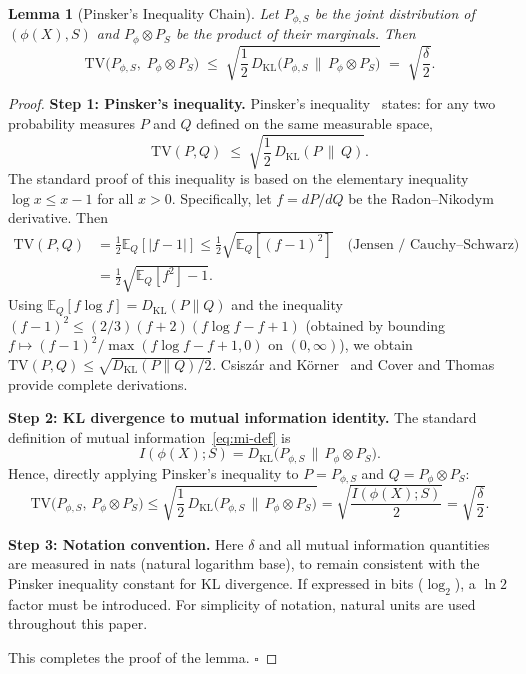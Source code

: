 \documentclass[12pt,a4paper]{article}
\newtheorem{lemma}[theorem]{Lemma}
\newcommand{\E}{\mathbb{E}}
\newcommand{\KL}{D_{\mathrm{KL}}}
\newcommand{\TV}{\mathrm{TV}}
\begin{document}
\begin{lemma}[Pinsker's Inequality Chain]
\label{lem:pinsker}
Let $P_{\phi,S}$ be the joint distribution of $(\phi(X), S)$ and
$P_\phi \otimes P_S$ be the product of their marginals.
Then
\begin{equation}\label{eq:pinsker-chain}
    \TV\bigl(P_{\phi,S},\; P_\phi \otimes P_S\bigr)
    \;\leq\; \sqrt{\frac{1}{2}\,\KL\bigl(P_{\phi,S} \,\big\|\,
                        P_\phi \otimes P_S\bigr)}
    \;=\; \sqrt{\frac{\delta}{2}}.
\end{equation}
\end{lemma}

\begin{proof}
\textbf{Step 1: Pinsker's inequality.}
Pinsker's inequality~\citep{pinsker1964information,cover1999elements} states:
for any two probability measures $P$ and $Q$ defined on the same measurable space,
\begin{equation}\label{eq:pinsker-raw}
    \TV(P, Q) \;\leq\; \sqrt{\frac{1}{2}\,\KL(P \,\|\, Q)}.
\end{equation}
The standard proof of this inequality is based on the elementary inequality $\log x \leq x-1$ for all $x>0$.
Specifically, let $f = dP/dQ$ be the Radon--Nikodym derivative. Then
\begin{align*}
    \TV(P,Q) &= \frac12 \E_Q[|f-1|]
             \leq \frac12 \sqrt{\E_Q[(f-1)^2]} \quad\text{(Jensen / Cauchy--Schwarz)}\\
             &= \frac12 \sqrt{\E_Q[f^2] - 1}.
\end{align*}
Using $\E_Q[f\log f] = \KL(P\|Q)$ and the inequality
$(f-1)^2 \leq (2/3)(f+2)(f\log f - f + 1)$ (obtained by bounding $f\mapsto (f-1)^2/\max(f\log f - f + 1, 0)$ on $(0,\infty)$),
we obtain $\TV(P,Q) \leq \sqrt{\KL(P\|Q)/2}$. Csisz\'ar and K\"orner~\citep{csiszar2011information}
and Cover and Thomas~\citep{cover1999elements} provide complete derivations.

\textbf{Step 2: KL divergence to mutual information identity.}
The standard definition of mutual information~\eqref{eq:mi-def} is
\[
I(\phi(X); S) = \KL\bigl(P_{\phi,S} \,\|\, P_\phi \otimes P_S\bigr).
\]
Hence, directly applying Pinsker's inequality to $P = P_{\phi,S}$ and $Q = P_\phi \otimes P_S$:
\[
\TV\bigl(P_{\phi,S},\, P_\phi \otimes P_S\bigr)
\leq \sqrt{\frac{1}{2}\,\KL\bigl(P_{\phi,S} \,\|\, P_\phi \otimes P_S\bigr)}
= \sqrt{\frac{I(\phi(X); S)}{2}}
= \sqrt{\frac{\delta}{2}}.
\]

\textbf{Step 3: Notation convention.}
Here $\delta$ and all mutual information quantities are measured in nats (natural logarithm base), to remain consistent with the Pinsker inequality constant for KL divergence. If expressed in bits ($\log_2$), a $\ln 2$ factor must be introduced. For simplicity of notation, natural units are used throughout this paper.

This completes the proof of the lemma. \hfill$\square$
\end{proof}
\end{document}
